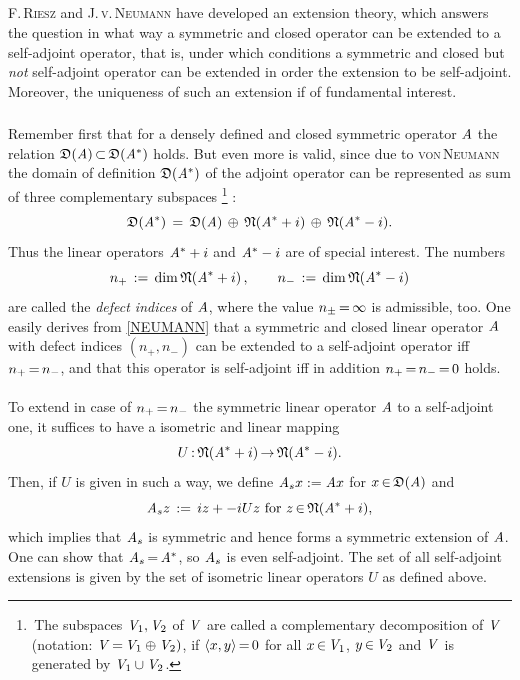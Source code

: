 \documentclass[11pt,twoside]{article}
\begin{document}
\subparagraph*{}
\textsc{F.\,Riesz} and \textsc{J.\,v.\,Neumann} 
have developed an extension theory,
which answers the question
in what way a symmetric and closed operator
can be extended to a self-adjoint operator,
that is,
under which conditions a symmetric and closed
but \textit{not} self-adjoint operator can be extended
in order the extension to be self-adjoint.
Moreover,
the uniqueness of such an extension if of fundamental interest.

\subsubsection*{}
Remember first
that for a densely defined and closed symmetric operator $\mathit{A}$
the relation $\mathfrak{D}(\mathit{A}) {\,\subset\,} \mathfrak{D}(\mathit{A}^*)$ holds.
But even more is valid,
since due to \textsc{von\,Neumann} 
the domain of definition $\mathfrak{D}(\mathit{A}^*)$ of the adjoint operator
can be represented as sum of three complementary subspaces \footnote{
\,The subspaces $\mathit{V}_1,\mathit{V}_2$ of $\mathit{V}$
are called a complementary decomposition of $\mathit{V}$
(notation: $\mathit{V} {\,=\,} \mathit{V}_1 \oplus \mathit{V}_2)$,
if $\langle x,y \rangle {\,=\,} 0$ for all $x {\,\in\,} \mathit{V}_1$, $y {\,\in\,} \mathit{V}_2$
and $\mathit{V}$ is generated by $\mathit{V}_1 \cup \mathit{V}_2$.}
:
\begin{equation}\label{NEUMANN}
\mathfrak{D}(\mathit{A}^*) \,=\, \mathfrak{D}(\mathit{A}) \, \oplus \, \mathfrak{N}(\mathit{A}^*+i)
                                   \, \oplus \, \mathfrak{N}(\mathit{A}^*-i).
\end{equation}
Thus the linear operators $\mathit{A}^*+i$ and $\mathit{A}^*-i$ are of special interest.
The numbers
\[
n_+ \,:=\, \operatorname{dim} \mathfrak{N}(\mathit{A}^*+i)\,,\quad \quad
n_- \,:=\, \operatorname{dim} \mathfrak{N}(\mathit{A}^*-i)
\]
are called the \textit{defect indices} of $\mathit{A}$,
where the value $n_{\pm} {\,=\,} \infty$ is admissible, too.
One easily derives from \eqref{NEUMANN}
that a symmetric and closed linear operator $\mathit{A}$
with defect indices $(n_+,n_-)$ can be extended to a self-adjoint operator
iff $n_+ {\,=\,} n_-$,
and that this operator is self-adjoint
iff in addition $n_+ {\,=\,} n_- {\,=\,} 0$ holds.

\paragraph*{}
To extend in case of $n_+ {\,=\,} n_-$ the symmetric linear operator $\mathit{A}$
to a self-adjoint one,
it suffices to have a isometric and linear mapping
\[
U {\,:\,} \mathfrak{N}(\mathit{A}^*+i) {\,\to\,} \mathfrak{N}(\mathit{A}^*-i).
\]
Then, if $U$ is given in such a way, we define $\mathit{A}_s x := \mathit{A} x$
for $x {\,\in\,} \mathfrak{D}(\mathit{A})$ and
\[
\mathit{A}_s z \,:=\, iz +-i U z \mbox{ for } z {\,\in\,} \mathfrak{N}(\mathit{A}^* + i),
\]
which implies that $\mathit{A}_s$ is symmetric and hence forms a symmetric extension
of $\mathit{A}$.
One can show that $\mathit{A}_s {\,=\,} \mathit{A}^*$, so $\mathit{A}_s$ is even self-adjoint.
The set of all self-adjoint extensions is given by the set of isometric linear
operators $U$ as defined above.
\end{document}
